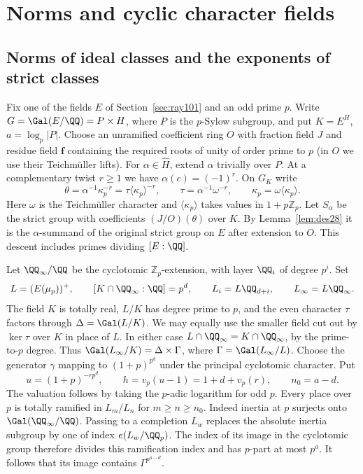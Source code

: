 \documentclass[a4paper,11pt]{article}
\theoremstyle{definition}
\theoremstyle{remark}
\newcommand{\ZZ}{\mathbb Z}\newcommand{\ord}{\operatorname{ord}}
\numberwithin{equation}{section}
\begin{document}
\section{Norms and cyclic character fields}\label{nav:g-III-2}

\subsection{Norms of ideal classes and the exponents of strict classes}\label{nav:III-24}
\label{sec:norm191}

Fix one of the fields \(E\) of Section~\ref{sec:ray101} and an odd
prime \(p\). Write \(G=\Gal(E/\QQ)=P\times H\), where \(P\) is the
\(p\)-Sylow subgroup, and put \(K=E^H\), \(a=\log_p|P|\).
Choose an unramified coefficient ring \(O\) with fraction field \(J\)
and residue field \(\mathbf f\) containing the required roots of
unity of order prime to \(p\) (in \(O\) we use their Teichmüller
lifts). For \(\alpha\in\widehat H\), extend \(\alpha\) trivially
over \(P\). At a complementary twist \(r\ge1\) we have
\(\alpha(c)=(-1)^r\). On \(G_K\) write
\[
 \theta=\alpha^{-1}\kappa_p^{-r}
       =\tau\langle\kappa_p\rangle^{-r},\qquad
 \tau=\alpha^{-1}\omega^{-r},\qquad
 \kappa_p=\omega\langle\kappa_p\rangle .
\]
Here \(\omega\) is the Teichmüller character and
\(\langle\kappa_p\rangle\) takes values in \(1+p\ZZ_p\).
Let \(S_\alpha\) be the strict group with coefficients
\((J/O)(\theta)\) over \(K\). By Lemma~\ref{lem:des28} it is the
\(\alpha\)-summand of the original strict group on \(E\) after
extension to \(O\). This descent includes primes dividing \([E:\QQ]\).

Let \(\QQ_\infty/\QQ\) be the cyclotomic \(\ZZ_p\)-extension,
with layer \(\QQ_i\) of degree \(p^i\). Set
\[
 L=(E(\mu_p))^+,\qquad
 [K\cap\QQ_\infty:\QQ]=p^d,\qquad
 L_i=L\QQ_{d+i},\qquad L_\infty=L\QQ_\infty .
\]
The field \(K\) is totally real, \(L/K\) has degree prime to \(p\),
and the even character \(\tau\) factors through
\(\Delta=\Gal(L/K)\). We may equally use the smaller field cut out
by \(\ker\tau\) over \(K\) in place of \(L\). In either case
\(L\cap\QQ_\infty=K\cap\QQ_\infty\), by the prime-to-\(p\)
degree. Thus \(\Gal(L_\infty/K)=\Delta\times\Gamma\), where
\(\Gamma=\Gal(L_\infty/L)\). Choose the generator \(\gamma\) mapping
to \((1+p)^{p^d}\) under the principal cyclotomic character. Put
\[
       u=(1+p)^{-rp^d},\qquad h=v_p(u-1)=1+d+v_p(r),
       \qquad n_0=a-d .
\]
The valuation follows by taking the \(p\)-adic logarithm for odd \(p\).
Every place over \(p\) is totally ramified in \(L_m/L_n\) for
\(m\ge n\ge n_0\). Indeed inertia at \(p\) surjects onto
\(\Gal(\QQ_\infty/\QQ)\). Passing to a completion \(L_w\) replaces
the absolute inertia subgroup by one of index \(e(L_w/\QQ_p)\).
The index of its image in the cyclotomic group therefore divides
this ramification index and has \(p\)-part at most \(p^a\).
It follows that its image contains \(\Gamma^{p^{a-d}}\).
\end{document}
